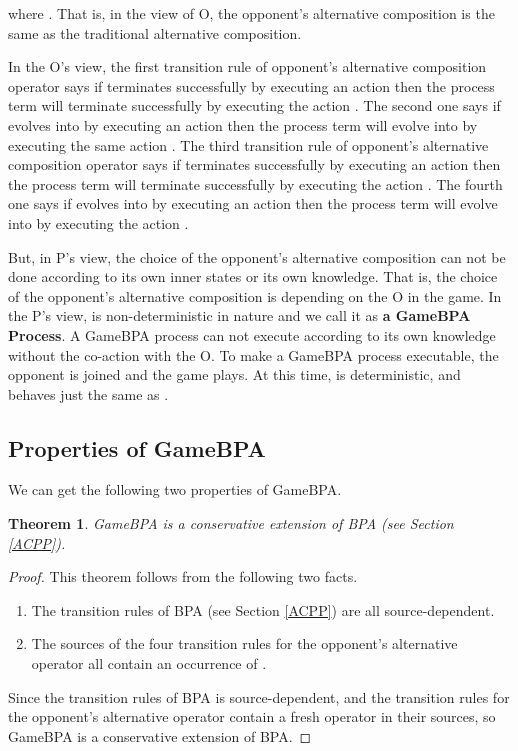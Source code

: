 \documentclass{fac}
\newtheorem{theorem}{Theorem}[section]
\begin{document}
where . That is, in the view of O, the opponent's alternative composition is the same as the traditional alternative composition.

In the O's view, the first transition rule of opponent's alternative composition operator  says if  terminates successfully by executing an action  then the process term  will terminate successfully by executing the action . The second one says if  evolves into  by executing an action  then the process term  will evolve into  by executing the same action . The third transition rule of opponent's alternative composition operator  says if  terminates successfully by executing an action  then the process term  will terminate successfully by executing the action . The fourth one says if  evolves into  by executing an action  then the process term  will evolve into  by executing the action .

But, in P's view, the choice of the opponent's alternative composition can not be done according to its own inner states or its own knowledge. That is, the choice of the opponent's alternative composition is depending on the O in the game. In the P's view,  is non-deterministic in nature and we call it as \textbf{a GameBPA Process}. A GameBPA process can not execute according to its own knowledge without the co-action with the O. To make a GameBPA process executable, the opponent is joined and the game plays. At this time,  is deterministic, and behaves just the same as .

\subsection{Properties of GameBPA}

We can get the following two properties of GameBPA.

\begin{theorem}
GameBPA is a conservative extension of BPA (see Section \ref{ACPP}).
\end{theorem}

\begin{proof}
This theorem follows from the following two facts.

\begin{enumerate}
  \item The transition rules of BPA (see Section \ref{ACPP}) are all source-dependent.
  \item The sources of the four transition rules for the opponent's alternative operator all contain an occurrence of .
\end{enumerate}

Since the transition rules of BPA is source-dependent, and the transition rules for the opponent's alternative operator contain a fresh operator in their
sources, so GameBPA is a conservative extension of BPA.
\end{proof}
\end{document}
